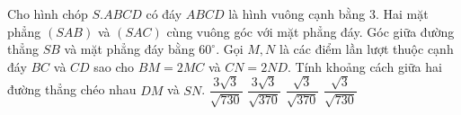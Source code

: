 \begin{ex}%
	Cho hình chóp $ S.ABCD $ có đáy $ ABCD $ là hình vuông cạnh bằng $ 3 $. Hai mặt phẳng $ (SAB) $ và $ (SAC) $ cùng vuông góc với mặt phẳng đáy. Góc giữa đường thẳng $ SB $ và mặt phẳng đáy bằng $ 60^{\circ} $. Gọi $ M, N $ là các điểm lần lượt thuộc cạnh đáy $ BC $ và $ CD $ sao cho $ BM = 2MC $ và $ CN = 2 ND $. Tính khoảng cách giữa hai đường thẳng chéo nhau $ DM $ và $ SN $.
	\choice
	{$ \dfrac{3\sqrt{3} }{\sqrt{730}} $}
	{\True $ \dfrac{3\sqrt{3} }{\sqrt{370}} $}
	{$ \dfrac{\sqrt{3} }{\sqrt{370}} $}
	{$ \dfrac{\sqrt{3} }{\sqrt{730}} $}
\end{ex}
